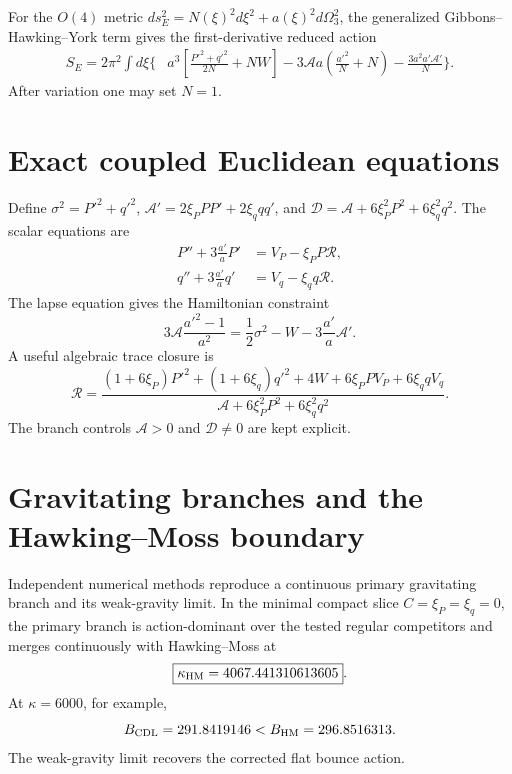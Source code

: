 \documentclass[11pt]{article}
\begin{document}
For the $O(4)$ metric $ds_E^2=N(\xi)^2d\xi^2+a(\xi)^2d\Omega_3^2$, the generalized Gibbons--Hawking--York term gives the first-derivative reduced action
\begin{align}
S_E=2\pi^2\int d\xi\Bigg\{&a^3\left[\frac{P'^2+q'^2}{2N}+NW\right]-3\mathcal A a\left(\frac{a'^2}{N}+N\right)-\frac{3a^2a'\mathcal A'}{N}\Bigg\}.
\end{align}
After variation one may set $N=1$.

\section{Exact coupled Euclidean equations}

Define $\sigma^2=P'^2+q'^2$, $\mathcal A'=2\xi_PPP'+2\xi_q q q'$, and $\mathcal D=\mathcal A+6\xi_P^2P^2+6\xi_q^2q^2$. The scalar equations are
\begin{align}
P''+3\frac{a'}aP'&=V_P-\xi_P P\mathcal R,\\
q''+3\frac{a'}aq'&=V_q-\xi_q q\mathcal R.
\end{align}
The lapse equation gives the Hamiltonian constraint
\begin{equation}
3\mathcal A\frac{a'^2-1}{a^2}=\frac12\sigma^2-W-3\frac{a'}a\mathcal A'.
\end{equation}
A useful algebraic trace closure is
\begin{equation}
\mathcal R=\frac{(1+6\xi_P)P'^2+(1+6\xi_q)q'^2+4W+6\xi_PPV_P+6\xi_q qV_q}{\mathcal A+6\xi_P^2P^2+6\xi_q^2q^2}.
\end{equation}
The branch controls $\mathcal A>0$ and $\mathcal D\neq0$ are kept explicit.

\section{Gravitating branches and the Hawking--Moss boundary}

Independent numerical methods reproduce a continuous primary gravitating branch and its weak-gravity limit. In the minimal compact slice $C=\xi_P=\xi_q=0$, the primary branch is action-dominant over the tested regular competitors and merges continuously with Hawking--Moss at
\begin{equation}
\boxed{\kappa_{\rm HM}=4067.441310613605}.
\end{equation}
At $\kappa=6000$, for example,
\begin{equation}
B_{\rm CDL}=291.8419146 < B_{\rm HM}=296.8516313.
\end{equation}
The weak-gravity limit recovers the corrected flat bounce action.
\end{document}
